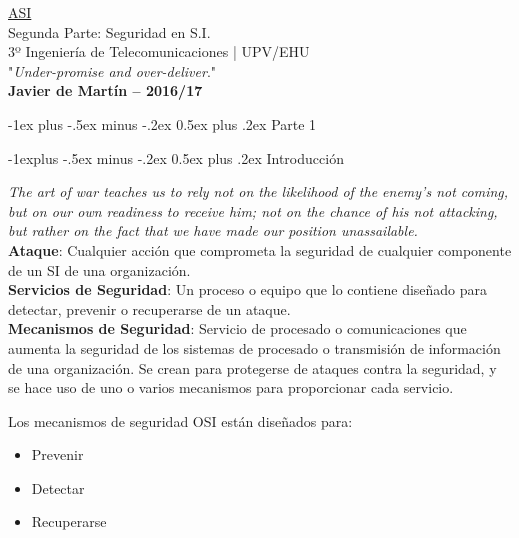 \documentclass[10pt,portrait, twocolumn]{article}
\makeatletter
\renewcommand{\section}{\@startsection{section}{1}{0mm}%
                                {-1ex plus -.5ex minus -.2ex}%
                                {0.5ex plus .2ex}%
                                {\normalfont\large\bfseries}}
\renewcommand{\subsection}{\@startsection{subsection}{2}{0mm}%
                                {-1explus -.5ex minus -.2ex}%
                                {0.5ex plus .2ex}%
                                {\normalfont\normalsize\bfseries}}
\makeatother
\begin{document}
\begin{framed}
	\begin{center}
    	\Large{\underline{ASI}} \\
	\large{Segunda Parte: Seguridad en S.I.} \\
    	\scriptsize{3º Ingeniería de Telecomunicaciones | UPV/EHU}\\
     	"\textsl{Under-promise and over-deliver}." \\
     	\small{\textbf{Javier de Martín -- 2016/17}}
	\end{center}
\end{framed}

\section{Parte 1}

\subsection{Introducción}

\textit{The art of war teaches us to rely not on the likelihood of the enemy's not coming, but on our own readiness to receive him; not on the chance of his not attacking, but rather on the fact that we have made our position unassailable.}\\

\textbf{Ataque}: Cualquier acción que comprometa la seguridad de cualquier componente de un SI de una organización.\\

\textbf{Servicios de Seguridad}: Un proceso o equipo que lo contiene diseñado para detectar, prevenir o recuperarse de un ataque.\\

\textbf{Mecanismos de Seguridad}: Servicio de procesado o comunicaciones que aumenta la seguridad de los sistemas de procesado o transmisión de información de una organización. Se crean para protegerse de ataques contra la seguridad, y se hace uso de uno o varios mecanismos para proporcionar cada servicio.

Los mecanismos de seguridad OSI están diseñados para:

	\begin{itemize}
		\item Prevenir
		\item Detectar
		\item Recuperarse
	\end{itemize}
	
\end{document}
